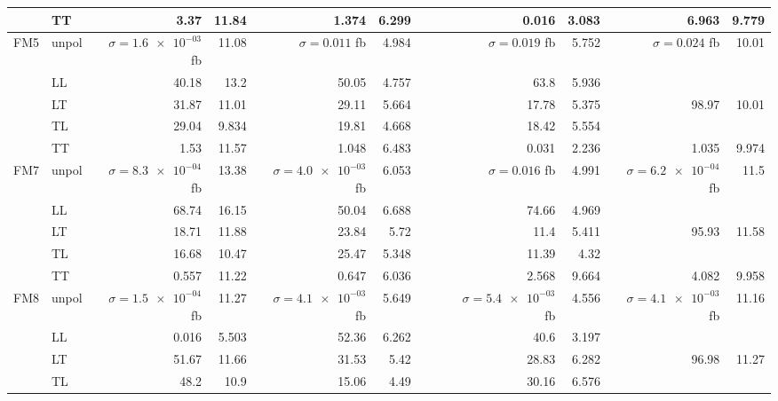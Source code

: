 \begin{table}[h]
{\begin{tabular}{llrrrrrrrrrr}
 & TT & \num{3.37} & \num{11.84} & \num{1.374} & \num{6.299} &  &  & \num{0.016} & \num{3.083} & \num{6.963} & \num{9.779} \\
\midrule
\multirow{5}{*}{FM5}
 & unpol & $\sigma = \num{1.6e-03}$ fb & \num{11.08} & $\sigma = \num{0.011}$ fb & \num{4.984} &  &  & $\sigma = \num{0.019}$ fb & \num{5.752} & $\sigma = \num{0.024}$ fb & \num{10.01} \\
 & LL & \num{40.18} & \num{13.2} & \num{50.05} & \num{4.757} &  &  & \num{63.8} & \num{5.936} &  &  \\
 & LT & \num{31.87} & \num{11.01} & \num{29.11} & \num{5.664} &  &  & \num{17.78} & \num{5.375} & \num{98.97} & \num{10.01} \\
 & TL & \num{29.04} & \num{9.834} & \num{19.81} & \num{4.668} &  &  & \num{18.42} & \num{5.554} &  &  \\
 & TT & \num{1.53} & \num{11.57} & \num{1.048} & \num{6.483} &  &  & \num{0.031} & \num{2.236} & \num{1.035} & \num{9.974} \\
\midrule
\multirow{5}{*}{FM7}
 & unpol & $\sigma = \num{8.3e-04}$ fb & \num{13.38} & $\sigma = \num{4.0e-03}$ fb & \num{6.053} &  &  & $\sigma = \num{0.016}$ fb & \num{4.991} & $\sigma = \num{6.2e-04}$ fb & \num{11.5} \\
 & LL & \num{68.74} & \num{16.15} & \num{50.04} & \num{6.688} &  &  & \num{74.66} & \num{4.969} &  &  \\
 & LT & \num{18.71} & \num{11.88} & \num{23.84} & \num{5.72} &  &  & \num{11.4} & \num{5.411} & \num{95.93} & \num{11.58} \\
 & TL & \num{16.68} & \num{10.47} & \num{25.47} & \num{5.348} &  &  & \num{11.39} & \num{4.32} &  &  \\
 & TT & \num{0.557} & \num{11.22} & \num{0.647} & \num{6.036} &  &  & \num{2.568} & \num{9.664} & \num{4.082} & \num{9.958} \\
\midrule
\multirow{5}{*}{FM8}
 & unpol & $\sigma = \num{1.5e-04}$ fb & \num{11.27} & $\sigma = \num{4.1e-03}$ fb & \num{5.649} &  &  & $\sigma = \num{5.4e-03}$ fb & \num{4.556} & $\sigma = \num{4.1e-03}$ fb & \num{11.16} \\
 & LL & \num{0.016} & \num{5.503} & \num{52.36} & \num{6.262} &  &  & \num{40.6} & \num{3.197} &  &  \\
 & LT & \num{51.67} & \num{11.66} & \num{31.53} & \num{5.42} &  &  & \num{28.83} & \num{6.282} & \num{96.98} & \num{11.27} \\
 & TL & \num{48.2} & \num{10.9} & \num{15.06} & \num{4.49} &  &  & \num{30.16} & \num{6.576} &  &  \\

\end{tabular}}
\end{table}
